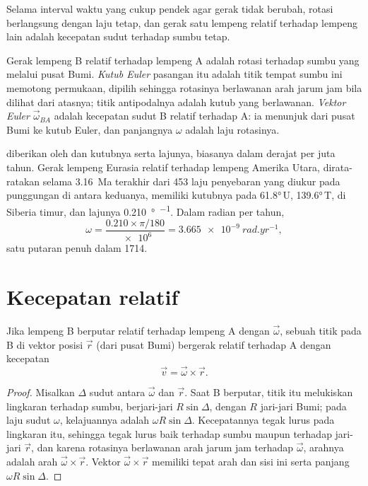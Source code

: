 Selama interval waktu yang cukup pendek agar gerak tidak berubah, rotasi berlangsung dengan laju tetap, dan gerak satu lempeng relatif terhadap lempeng lain adalah kecepatan sudut terhadap sumbu tetap.

\begin{definition}\label{def:b1:plate-kinematics:euler-pole}
Gerak lempeng B relatif terhadap lempeng A adalah rotasi terhadap sumbu yang melalui pusat Bumi. \emph{Kutub Euler} pasangan itu adalah titik tempat sumbu ini memotong permukaan, dipilih sehingga rotasinya berlawanan arah jarum jam bila dilihat dari atasnya; titik antipodalnya adalah kutub yang berlawanan. \emph{Vektor Euler}
$\vec\omega_{BA}$ adalah kecepatan sudut B relatif terhadap A: ia menunjuk dari pusat Bumi ke kutub Euler, dan panjangnya $\omega$ adalah laju rotasinya.
\end{definition}

 diberikan oleh  dan  kutubnya serta lajunya, biasanya dalam derajat per juta tahun. Gerak lempeng Eurasia relatif terhadap lempeng Amerika Utara, dirata-ratakan selama \qty{3.16}{Ma} terakhir dari 453 laju penyebaran yang diukur pada punggungan di antara keduanya, memiliki kutubnya pada \ang{61.8}\,U, \ang{139.6}\,T, di Siberia timur, dan lajunya \qty{0.210}{\degree\per\Ma}. Dalam radian per tahun,
\[
  \omega = \frac{0.210\times\pi/180}{\num{e6}} = \qty{3.665e-9}{rad.yr^{-1}},
\]
satu putaran penuh dalam \qty{1714}{\Ma}.

\section{Kecepatan relatif}

\begin{theorem}\label{thm:b1:plate-kinematics:velocity}
Jika lempeng B berputar relatif terhadap lempeng A dengan  $\vec\omega$, sebuah titik pada B di vektor posisi $\vec r$ (dari pusat Bumi) bergerak relatif terhadap A dengan kecepatan
\[
  \vec v = \vec\omega\times\vec r .
\]
\end{theorem}

\begin{proof}
Misalkan $\Delta$ sudut antara $\vec\omega$ dan $\vec r$. Saat B berputar, titik itu melukiskan lingkaran terhadap sumbu, berjari-jari $R\sin\Delta$,
dengan $R$ jari-jari Bumi; pada laju sudut $\omega$, kelajuannya adalah
$\omega R\sin\Delta$. Kecepatannya tegak lurus pada lingkaran itu, sehingga tegak lurus
baik terhadap sumbu maupun terhadap jari-jari $\vec r$, dan karena rotasinya berlawanan arah jarum jam terhadap $\vec\omega$, arahnya adalah arah $\vec\omega\times\vec r$.
Vektor $\vec\omega\times\vec r$ memiliki tepat arah dan sisi ini serta panjang $\omega R\sin\Delta$.
\end{proof}

